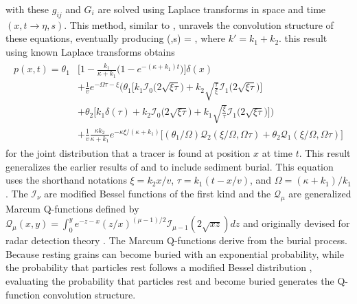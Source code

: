 \DIFdelbegin {}\DIFdelend \DIFaddbegin {}\DIFaddend with these $g_{ij}$ and $G_i$ are solved using Laplace transforms in space and time $(x,t \rightarrow 
\eta,s).$ This method, similar to \citet{Weeks1998}, unravels the convolution structure of these equations, eventually producing
\be {}(\eta,s) = , \label{eq:diffnicedist}\ee
where $k' = k_1 + k_2$. \DIFdelbegin {}\DIFdelend \DIFaddbegin {}\DIFaddend this result using known Laplace transforms \citep{Prudnikov1992a,Arfken1985} obtains
\begin{align}
	\begin{split}
		p(x,t) = \theta_1&\Big[1-\frac{k_1}{\kappa+k_1}\Big(1-e^{-(\kappa+k_1)t}\Big)\Big]\delta(x) \\ &+ \frac{1}{v}e^{-\Omega \tau - \xi}\Big(\theta_1\Big[k_1\mathcal{I}_0\big(2\sqrt{\xi\tau}\big) + k_2\sqrt{\frac{\tau}{\xi}}\mathcal{I}_1\big(2\sqrt{\xi\tau}\big)\Big] \\ 
		&+ \theta_2\Big[k_1\delta(\tau) + k_2 \mathcal{I}_0\big(2\sqrt{\xi\tau}\big)+k_1 \sqrt{\frac{\xi}{\tau}}\mathcal{I}_1\big(2\sqrt{\xi\tau}\big)\Big]\Big) \\
		&+ \frac{1}{v}\frac{\kappa k_2}{\kappa + k_1}e^{-\kappa \xi/(\kappa + k_1)}\Big[(\theta_1/\Omega)\mathcal{Q}_2(\xi/\Omega,\Omega\tau) + \theta_2 \mathcal{Q}_1(\xi/\Omega,\Omega\tau)\Big]
		\label{eq:pdf}
	\end{split}
\end{align}
for the joint distribution that a tracer is found at position $x$ at time $t$.
This result generalizes the earlier results of \citet{Lisle1998} and \citet{Einstein1937} to include sediment burial.
This equation uses the shorthand notations $\xi = k_2 x/v$, $\tau = k_1(t-x/v)$, and $\Omega = (\kappa+k_1)/k_1$ \DIFdelbegin {}\DIFdelend \DIFaddbegin {}\DIFaddend . The $\mathcal{I}_\nu$ are modified Bessel functions of the first kind and the $\mathcal{Q}_\mu$ are generalized Marcum Q-functions defined by $\mathcal{Q}_\mu(x,y) = \int_0^y e^{-z-x}(z/x)^{(\mu-1)/2}\mathcal{I}_{\mu-1}(2\sqrt{xz})dz $ and originally devised for radar detection theory \citep{Marcum1960,Temme1996}. 
The Marcum Q-functions derive from the burial process.
Because resting grains can become buried with an exponential probability, while the probability that particles rest follows a modified Bessel distribution \citep{Einstein1937,Lisle1998}, evaluating the probability that particles rest and become buried generates the Q-function convolution structure. 

